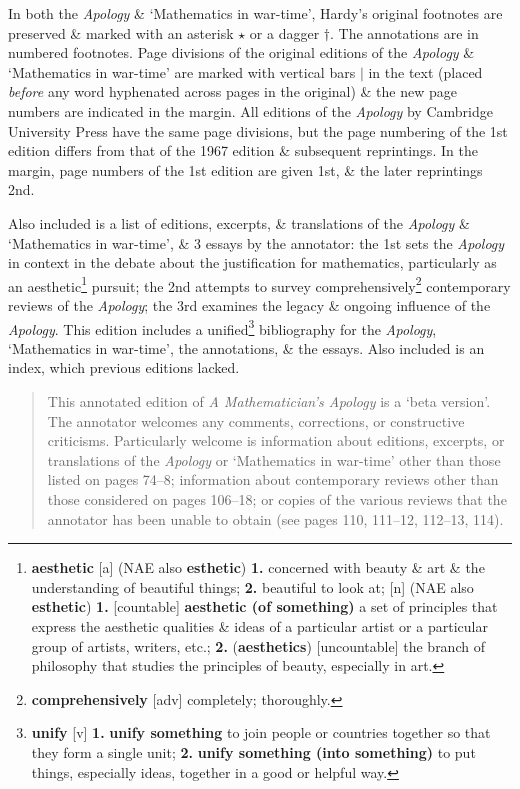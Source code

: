 \documentclass[oneside]{book}
\numberwithin{equation}{section}
\begin{document}
In both the \textit{Apology} \& `Mathematics in war-time', Hardy's original footnotes are preserved \& marked with an asterisk $\star$ or a dagger $\dagger$. The annotations are in numbered footnotes. Page divisions of the original editions of the \textit{Apology} \& `Mathematics in war-time' are marked with vertical bars $|$ in the text (placed \textit{before} any word hyphenated across pages in the original) \& the new page numbers are indicated in the margin. All editions of the \textit{Apology} by Cambridge University Press have the same page divisions, but the page numbering of the 1st edition differs from that of the 1967 edition \& subsequent reprintings. In the margin, page numbers of the 1st edition are given 1st, \& the later reprintings 2nd.

Also included is a list of editions, excerpts, \& translations of the \textit{Apology} \& `Mathematics in war-time', \& 3 essays by the annotator: the 1st sets the \textit{Apology} in context in the debate about the justification for mathematics, particularly as an aesthetic\footnote{\textbf{aesthetic} [a] (NAE also \textbf{esthetic}) \textbf{1.} concerned with beauty \& art \& the understanding of beautiful things; \textbf{2.} beautiful to look at; [n] (NAE also \textbf{esthetic}) \textbf{1.} [countable] \textbf{aesthetic (of something)} a set of principles that express the aesthetic qualities \& ideas of a particular artist or a particular group of artists, writers, etc.; \textbf{2.} (\textbf{aesthetics}) [uncountable] the branch of philosophy that studies the principles of beauty, especially in art.} pursuit; the 2nd attempts to survey comprehensively\footnote{\textbf{comprehensively} [adv] completely; thoroughly.} contemporary reviews of the \textit{Apology}; the 3rd examines the legacy \& ongoing influence of the \textit{Apology}. This edition includes a unified\footnote{\textbf{unify} [v] \textbf{1.} \textbf{unify something} to join people or countries together so that they form a single unit; \textbf{2.} \textbf{unify something (into something)} to put things, especially ideas, together in a good or helpful way.} bibliography for the \textit{Apology}, `Mathematics in war-time', the annotations, \& the essays. Also included is an index, which previous editions lacked.
\begin{quotation}
	This annotated edition of \textit{A Mathematician's Apology} is a `beta version'. The annotator welcomes any comments, corrections, or constructive criticisms. Particularly welcome is information about editions, excerpts, or translations of the \textit{Apology} or `Mathematics in war-time' other than those listed on pages 74--8; information about contemporary reviews other than those considered on pages 106--18; or copies of the various reviews that the annotator has been unable to obtain (see pages 110, 111--12, 112--13, 114).
\end{quotation}
\end{document}
